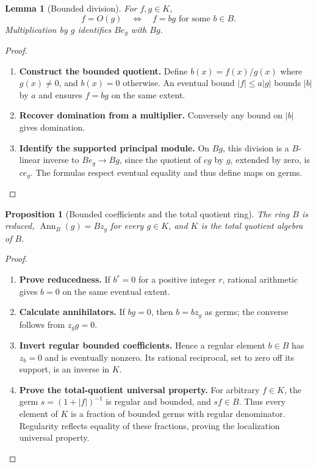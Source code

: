 \documentclass[11pt,a4paper]{article}
\numberwithin{algorithm}{section}
\numberwithin{equation}{section}
\newtheorem{proposition}[proposition]{Proposition}
\newtheorem{lemma}[lemma]{Lemma}
\theoremstyle{definition}
\theoremstyle{remark}
\theoremstyle{plain}
\newcommand{\abs}[1]{\lvert #1\rvert}
\newcommand{\Ann}{\operatorname{Ann}}
\theoremstyle{definition}
\theoremstyle{plain}
\begin{document}
\begin{lemma}[Bounded division]\label{lem:bounded-division}
For $f,g\in K$,
\[
 f=O(g)\quad\Longleftrightarrow\quad f=bg\text{ for some }b\in B.
\]
Multiplication by $g$ identifies $Be_g$ with $Bg$.
\end{lemma}
\begin{proof}\leavevmode
\begin{enumerate}[leftmargin=*,align=left]
\item \textbf{Construct the bounded quotient.}
Define $b(x)=f(x)/g(x)$ where $g(x)\ne0$, and $b(x)=0$ otherwise.
An eventual bound $\abs f\le a\abs g$ bounds $\abs b$ by $a$ and
ensures $f=bg$ on the same extent.

\item \textbf{Recover domination from a multiplier.}
Conversely any bound on $\abs b$
gives domination.

\item \textbf{Identify the supported principal module.}
On $Bg$, this division is a $B$-linear inverse to
$Be_g\to Bg$, since the quotient of $cg$ by $g$, extended by zero,
is $ce_g$. The formulas respect eventual equality and thus define
maps on germs.
\end{enumerate}
\end{proof}

\begin{proposition}[Bounded coefficients and the total quotient ring]\label{prop:signed-coefficients}
The ring $B$ is reduced, $\Ann_B(g)=Bz_g$ for every $g\in K$, and
$K$ is the total quotient algebra of $B$.
\end{proposition}
\begin{proof}\leavevmode
\begin{enumerate}[leftmargin=*,align=left]
\item \textbf{Prove reducedness.}
If $b^r=0$ for a positive integer $r$, rational arithmetic gives $b=0$
on the same eventual extent.

\item \textbf{Calculate annihilators.}
If $bg=0$, then $b=bz_g$ as germs;
the converse follows from $z_gg=0$.

\item \textbf{Invert regular bounded coefficients.}
Hence a regular element $b\in B$
has $z_b=0$ and is eventually nonzero. Its rational reciprocal, set
to zero off its support, is an inverse in $K$.

\item \textbf{Prove the total-quotient universal property.}
For arbitrary $f\in K$, the germ $s=(1+\abs f)^{-1}$ is regular
and bounded, and $sf\in B$. Thus every element of $K$ is a fraction
of bounded germs with regular denominator. Regularity reflects
equality of these fractions, proving the localization universal property.
\end{enumerate}
\end{proof}
\end{document}
